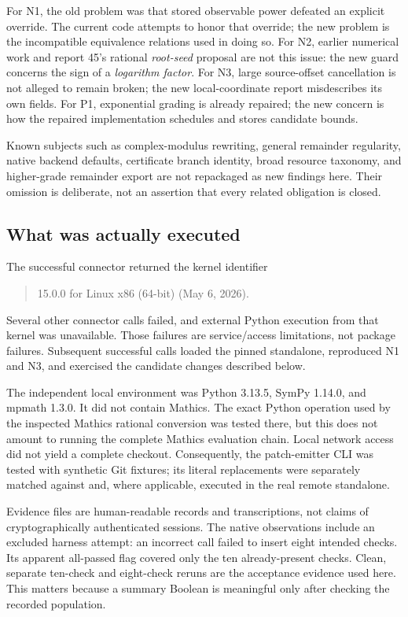\documentclass[11pt,letterpaper]{article}
\newcommand{\code}[1]{\texttt{\detokenize{#1}}}
\begin{document}
For N1, the old problem was that stored observable power defeated an explicit override. The current code attempts to honor that override; the new problem is the incompatible equivalence relations used in doing so. For N2, earlier numerical work and report 45's rational \emph{root-seed} proposal are not this issue: the new guard concerns the sign of a \emph{logarithm factor}. For N3, large source-offset cancellation is not alleged to remain broken; the new local-coordinate report misdescribes its own fields. For P1, exponential grading is already repaired; the new concern is how the repaired implementation schedules and stores candidate bounds.~\cite{status,wave3,wave5,core,mathicsnum,numchecks,flatops}

Known subjects such as complex-modulus rewriting, general remainder regularity, native backend defaults, certificate branch identity, broad resource taxonomy, and higher-grade remainder export are not repackaged as new findings here. Their omission is deliberate, not an assertion that every related obligation is closed.

\subsection{What was actually executed}
The successful connector returned the kernel identifier
\begin{quote}\ttfamily\small
15.0.0 for Linux x86 (64-bit) (May 6, 2026).
\end{quote}
Several other connector calls failed, and external Python execution from that kernel was unavailable. Those failures are service/access limitations, not package failures. Subsequent successful calls loaded the pinned standalone, reproduced N1 and N3, and exercised the candidate changes described below.

The independent local environment was Python 3.13.5, SymPy 1.14.0, and mpmath 1.3.0. It did not contain Mathics. The exact Python operation used by the inspected Mathics rational conversion was tested there, but this does not amount to running the complete Mathics evaluation chain. Local network access did not yield a complete checkout. Consequently, the patch-emitter CLI was tested with synthetic Git fixtures; its literal replacements were separately matched against and, where applicable, executed in the real remote standalone.

Evidence files are human-readable records and transcriptions, not claims of cryptographically authenticated sessions. The native observations include an excluded harness attempt: an incorrect \code{AssociateTo} call failed to insert eight intended checks. Its apparent all-passed flag covered only the ten already-present checks. Clean, separate ten-check and eight-check reruns are the acceptance evidence used here. This matters because a summary Boolean is meaningful only after checking the recorded population.
\end{document}
